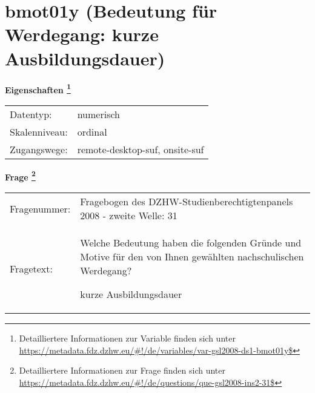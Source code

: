 
    \setcounter{footnote}{0}

    \vspace*{-1.8cm}
	\section{bmot01y (Bedeutung für Werdegang: kurze Ausbildungsdauer)}
	\label{section:bmot01y}



    \vspace*{0.5cm}
    \noindent\textbf{Eigenschaften
	\footnote{Detailliertere Informationen zur Variable finden sich unter
		\url{https://metadata.fdz.dzhw.eu/\#!/de/variables/var-gsl2008-ds1-bmot01y$}}}\\
	\begin{tabularx}{\hsize}{@{}lX}
	Datentyp: & numerisch \\
	Skalenniveau: & ordinal \\
	Zugangswege: &
	  remote-desktop-suf, 
	  onsite-suf
 \\
    \end{tabularx}



				\vspace*{0.5cm}
                \noindent\textbf{Frage
	                \footnote{Detailliertere Informationen zur Frage finden sich unter
		              \url{https://metadata.fdz.dzhw.eu/\#!/de/questions/que-gsl2008-ins2-31$}}}\\
				\begin{tabularx}{\hsize}{@{}lX}
					Fragenummer: &
					  Fragebogen des DZHW-Studienberechtigtenpanels 2008 - zweite Welle:
					  31
 \\
					Fragetext: & Welche Bedeutung haben die folgenden Gründe und Motive für den von Ihnen gewählten nachschulischen Werdegang?\par  kurze Ausbildungsdauer \\
				\end{tabularx}





